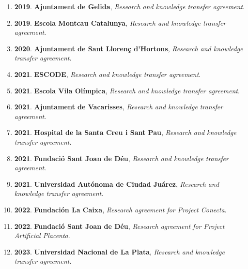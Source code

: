 \begin{enumerate}
\item {\bf 2019}. {\bf Ajuntament de Gelida}, {\it Research and knowledge transfer agreement}.\filbreak
\item {\bf 2019}. {\bf Escola Montcau Catalunya}, {\it Research and knowledge transfer agreement}.\filbreak
\item {\bf 2020}. {\bf Ajuntament de Sant Llorenç d'Hortons}, {\it Research and knowledge transfer agreement}.\filbreak
\item {\bf 2021}. {\bf ESCODE}, {\it Research and knowledge transfer agreement}.\filbreak
\item {\bf 2021}. {\bf Escola Vila Olímpica}, {\it Research and knowledge transfer agreement}.\filbreak
\item {\bf 2021}. {\bf Ajuntament de Vacarisses}, {\it Research and knowledge transfer agreement}.\filbreak
\item {\bf 2021}. {\bf Hospital de la Santa Creu i Sant Pau}, {\it Research and knowledge transfer agreement}.\filbreak
\item {\bf 2021}. {\bf Fundació Sant Joan de Déu}, {\it Research and knowledge transfer agreement}.\filbreak
\item {\bf 2021}. {\bf Universidad Autónoma de Ciudad Juárez}, {\it Research and knowledge transfer agreement}.\filbreak
\item {\bf 2022}. {\bf Fundación La Caixa}, {\it Research agreement for Project Conecta}.\filbreak
\item {\bf 2022}. {\bf Fundació Sant Joan de Déu}, {\it Research agreement for Project Artificial Placenta}.\filbreak
\item {\bf 2023}. {\bf Universidad Nacional de La Plata}, {\it Research and knowledge transfer agreement}.\filbreak
\end{enumerate} 
